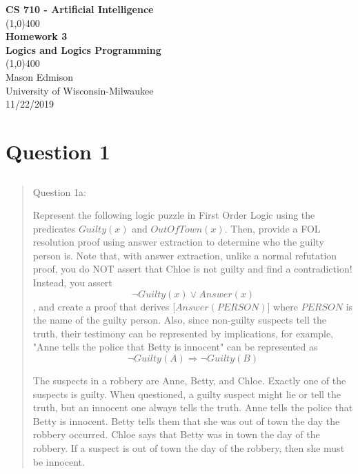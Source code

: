 \documentclass[11pt]{article}
\begin{document}
\begin{titlepage}
\begin{center}
\Large{\textbf{CS 710 - Artificial Intelligence}} \\
\vfill
\line(1,0){400} \\
\huge{\textbf{Homework 3}} \\
\Large{\textbf{Logics and Logics Programming}} \\
\line(1,0){400}\\
\vfill
Mason Edmison\\
University of Wisconsin-Milwaukee\\
11/22/2019
\end{center}
\end{titlepage}

\section{Question 1}
\subsection{}
\begin{quote}
Question 1a:

Represent the following logic puzzle in First Order Logic using the predicates $Guilty(x)$ and $OutOfTown(x)$.  Then, provide a FOL resolution proof using answer extraction to determine who the guilty person is. Note that, with answer extraction,  unlike a normal refutation proof, you do NOT assert that Chloe is not guilty and find a contradiction! Instead, you assert $$\lnot Guilty(x) \lor Answer(x)$$, and create a proof that derives [$Answer(PERSON)]$ where $PERSON$ is the name of the guilty person.  Also, since non-guilty suspects tell the truth, their testimony can be represented by implications, for example, "Anne tells the police that Betty is innocent" can be represented as $$\lnot Guilty(A) \Rightarrow  \lnot Guilty(B)$$

The suspects in a robbery are Anne, Betty, and Chloe.
Exactly one of the suspects is guilty.
When questioned, a guilty suspect might lie or tell the truth, but an innocent one always tells the truth.
Anne tells the police that Betty is innocent.
Betty tells them that she was out of town the day the robbery occurred.
Chloe says that Betty was in town the day of the robbery.
If a suspect is out of town the day of the robbery, then she must be innocent.
\end{quote}
\end{document}

